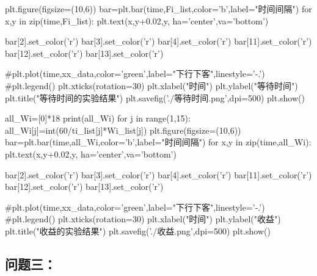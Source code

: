 \documentclass[UTF8]{ctexart}
\begin{document}
\begin{python}
		plt.figure(figsize=(10,6))
		bar=plt.bar(time,Fi_list,color='b',label="时间间隔")
		for x,y in zip(time,Fi_list):
		plt.text(x,y+0.02,y, ha='center',va='bottom')
		
		bar[2].set_color('r')
		bar[3].set_color('r')
		bar[4].set_color('r')
		bar[11].set_color('r')
		bar[12].set_color('r')
		bar[13].set_color('r')
		
		#plt.plot(time,xx_data,color='green',label="下行下客",linestyle='-.')
		#plt.legend()
		plt.xticks(rotation=30)
		plt.xlabel("时间")
		plt.ylabel("等待时间")
		plt.title("等待时间的实验结果")
		plt.savefig('./等待时间.png',dpi=500)
		plt.show()
		
		all_Wi=[0]*18
		print(all_Wi)
		for j in range(1,15):
		all_Wi[j]=int(60/ti_list[j]*Wi_list[j])
		plt.figure(figsize=(10,6))
		bar=plt.bar(time,all_Wi,color='b',label="时间间隔")
		for x,y in zip(time,all_Wi):
		plt.text(x,y+0.02,y, ha='center',va='bottom')
		
		bar[2].set_color('r')
		bar[3].set_color('r')
		bar[4].set_color('r')
		bar[11].set_color('r')
		bar[12].set_color('r')
		bar[13].set_color('r')
		
		#plt.plot(time,xx_data,color='green',label="下行下客",linestyle='-.')
		#plt.legend()
		plt.xticks(rotation=30)
		plt.xlabel("时间")
		plt.ylabel("收益")
		plt.title("收益的实验结果")
		plt.savefig('./收益.png',dpi=500)
		plt.show()
	\end{python}
	\subsection{问题三：}
	
\end{document}
